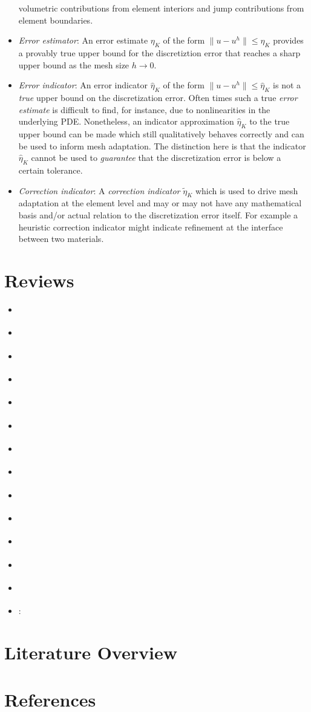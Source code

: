\documentclass{article}
\begin{document}
\begin{itemize}
volumetric contributions from element interiors and jump contributions from
element boundaries.
\item \emph{Error estimator}: An error estimate $\eta_K$ of the form
$\| u - u^h \| \leq \eta_K$ provides a provably true upper bound for the
discretiztion error that reaches a sharp upper bound as the mesh size
$h \to 0$.
\item \emph{Error indicator}: An error indicator $\hat{\eta}_K$ of the
form $\| u - u^h \| \leq \hat{\eta}_K$ is not a \emph{true} upper bound
on the discretization error. Often times such a true \emph{error estimate}
is difficult to find, for instance, due to nonlinearities in the
underlying PDE. Nonetheless, an indicator approximation $\hat{\eta}_K$
to the true upper bound can be made which still qualitatively behaves
correctly and can be used to inform mesh adaptation. The distinction here
is that the indicator $\hat{\eta}_K$ cannot be used to \emph{guarantee}
that the discretization error is below a certain tolerance.
\item \emph{Correction indicator}: A  \emph{correction indicator}
$\tilde{\eta}_K$ which is used to drive mesh adaptation at the element
level and may or may not have any mathematical basis and/or actual relation
to the discretization error itself. For example a heuristic correction
indicator might indicate refinement at the interface between two materials.
\end{itemize}

\section{Reviews}

\begin{itemize}
\item \cite{radovitzky1999error}
\item \cite{boussetta2006adaptive}
\item \cite{diez2000adaptivity}
\item \cite{ladeveze2003estimation}
\item \cite{verdugo2014error}
\item \cite{biotteau2012three}
\item \cite{combe2002discretization}
\item \cite{scovazzi2016simple}
\item \cite{molinari2002three}
\item \cite{luo2009adaptive}
\item \cite{lahiri2010variationally}
\item \cite{masud2013framework}
\item \cite{radovitzky1999error}
\item \cite{rodríguez2000error}:
\end{itemize}

\section{Literature Overview}

\section{References}



\end{document}
